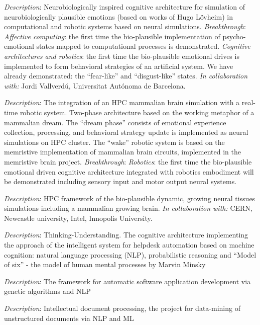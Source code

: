 \documentclass{moderncv}
\begin{document}
    {\small \emph{Description}: Neurobiologically inspired cognitive architecture for simulation of neurobiologically plausible emotions (based on works of Hugo L\"{o}vheim) in computational and robotic systems based on neural simulations.
    \emph{Breakthrough}: \emph{Affective computing}: the first time the bio-plausible implementation of psycho-emotional states mapped to computational processes is demonstrated. \emph{Cognitive architectures and robotics}: the first time the bio-plausible emotional drives is implemented to form behavioral strategies of an artificial system. We have already demonstrated: the ``fear-like'' and ``disgust-like'' states.
    \emph{In collaboration with:} Jordi Vallverd\'u, Universitat Aut\'onoma de Barcelona.}

    {\small \emph{Description}: The integration of an HPC mammalian brain simulation with a real-time robotic system. Two-phase architecture based on the working metaphor of a mammalian dream. The ``dream phase'' consists of emotional experience collection, processing, and behavioral strategy update is implemented as neural simulations on HPC cluster. The ``wake'' robotic system is based on the memristive implementation of mammalian brain circuits, implemented in the memristive brain project.
    \emph{Breakthrough}: \emph{Robotics}: the first time the bio-plausible emotional driven cognitive architecture integrated with robotics embodiment will be demonstrated including sensory input and motor output neural systems.}

    {\small \emph{Description}: HPC framework of the bio-plausible dynamic, growing neural tissues simulations including a mammalian growing brain.
    \emph{In collaboration with:} CERN, Newcastle university, Intel, Innopolis University.}

    {\small \emph{Description}: Thinking-Understanding. The cognitive architecture implementing the approach of the intelligent system for helpdesk automation based on machine cognition: natural language processing (NLP), probabilistic reasoning and ``Model of six'' - the model of human mental processes by Marvin Minsky}

    {\small \emph{Description}: The framework for automatic software application development via genetic algorithms and NLP}

    {\small \emph{Description}: Intellectual document processing, the project for data-mining of unstructured documents via NLP and ML}
\end{document}
